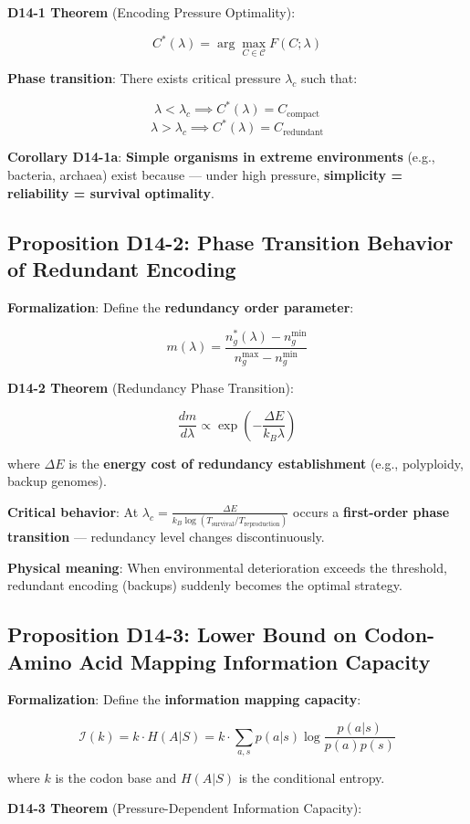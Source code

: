 \documentclass[12pt,a4paper]{article}
\newcommand{\calC}{\mathcal{C}}
\newcommand{\calI}{\mathcal{I}}
\newcommand{\calCcompact}{C_{\text{compact}}}
\newcommand{\calCredund}{C_{\text{redundant}}}
\newcommand{\calCstar}{C^*}
\newcommand{\lamc}{\lambda_c}
\newcommand{\nbgr}{n_g^*}
\newcommand{\nbgmin}{n_g^{\min}}
\newcommand{\nbgmax}{n_g^{\max}}
\newcommand{\kB}{k_B}
\newcommand{\deE}{\Delta E}
\newcommand{\Tsurv}{T_{\text{survival}}}
\newcommand{\Treprod}{T_{\text{reproduction}}}
\newcommand{\dm}{\frac{dm}{d\lambda}}
\newcommand{\dmexp}{\exp\left(-\frac{\deE}{\kB \lambda}\right)}
\begin{document}
\textbf{D14-1 Theorem} (Encoding Pressure Optimality):

$$\calCstar(\lambda) = \arg\max_{C \in \calC} F(C; \lambda)$$

\textbf{Phase transition}: There exists critical pressure $\lamc$ such that:

$$\lambda < \lamc \implies \calCstar(\lambda) = \calCcompact$$
$$\lambda > \lamc \implies \calCstar(\lambda) = \calCredund$$

\textbf{Corollary D14-1a}: \textbf{Simple organisms in extreme environments} (e.g., bacteria, archaea) exist because --- under high pressure, \textbf{simplicity = reliability = survival optimality}.

\subsection{Proposition D14-2: Phase Transition Behavior of Redundant Encoding}

\textbf{Formalization}: Define the \textbf{redundancy order parameter}:

$$m(\lambda) = \frac{\nbgr(\lambda) - \nbgmin}{\nbgmax - \nbgmin}$$

\textbf{D14-2 Theorem} (Redundancy Phase Transition):

$$\dm \propto \dmexp$$

where $\deE$ is the \textbf{energy cost of redundancy establishment} (e.g., polyploidy, backup genomes).

\textbf{Critical behavior}: At $\lamc = \frac{\deE}{\kB \log(\Tsurv/\Treprod)}$ occurs a \textbf{first-order phase transition} --- redundancy level changes discontinuously.

\textbf{Physical meaning}: When environmental deterioration exceeds the threshold, redundant encoding (backups) suddenly becomes the optimal strategy.

\subsection{Proposition D14-3: Lower Bound on Codon-Amino Acid Mapping Information Capacity}

\textbf{Formalization}: Define the \textbf{information mapping capacity}:

$$\calI(k) = k \cdot H(A|S) = k \cdot \sum_{a,s} p(a|s) \log \frac{p(a|s)}{p(a)p(s)}$$

where $k$ is the codon base and $H(A|S)$ is the conditional entropy.

\textbf{D14-3 Theorem} (Pressure-Dependent Information Capacity):
\end{document}
